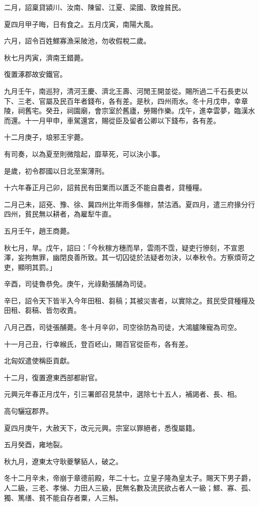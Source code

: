 \begin{pinyinscope}
二月，詔稟貸潁川、汝南、陳留、江夏、梁國、敦煌貧民。

夏四月甲子晦，日有食之。五月戊寅，南陽大風。

六月，詔令百姓鰥寡漁采陂池，勿收假稅二歲。

秋七月丙寅，濟南王錯薨。

復置涿郡故安鐵官。

九月壬午，南巡狩，清河王慶、濟北王壽、河閒王開並從。賜所過二千石長吏以下、三老、官屬及民百年者錢布，各有差。是秋，四州雨水。冬十月戊申，幸章陵，祠舊宅。癸丑，祠園廟，會宗室於舊廬，勞賜作樂。戊午，進幸雲夢，臨漢水而還。十一月甲申，車駕還宮，賜從臣及留者公卿以下錢布，各有差。

十二月庚子，琅邪王宇薨。

有司奏，以為夏至則微陰起，靡草死，可以決小事。

是歲，初令郡國以日北至案薄刑。

十六年春正月己卯，詔貧民有田業而以匱乏不能自農者，貸種糧。

二月己未，詔兗、豫、徐、冀四州比年雨多傷稼，禁沽酒。夏四月，遣三府掾分行四州，貧民無以耕者，為雇犁牛直。

五月壬午，趙王商薨。

秋七月，旱。戊午，詔曰：「今秋稼方穗而旱，雲雨不霑，疑吏行慘刻，不宣恩澤，妄拘無罪，幽閉良善所致。其一切囚徒於法疑者勿決，以奉秋令。方察煩苛之吏，顯明其罰。」

辛酉，司徒魯恭免。庚午，光祿勳張酺為司徒。

辛巳，詔令天下皆半入今年田租、芻稿；其被災害者，以實除之。貧民受貸種糧及田租、芻稿、皆勿收責。

八月己酉，司徒張酺薨。冬十月辛卯，司空徐防為司徒，大鴻臚陳寵為司空。

十一月己丑，行幸緱氏，登百岯山，賜百官從臣布，各有差。

北匈奴遣使稱臣貢獻。

十二月，復置遼東西部都尉官。

元興元年春正月戊午，引三署郎召見禁中，選除七十五人，補謁者、長、相。

高句驪寇郡界。

夏四月庚午，大赦天下，改元元興。宗室以罪絕者，悉復屬籍。

五月癸酉，雍地裂。

秋九月，遼東太守耿夔擊貊人，破之。

冬十二月辛未，帝崩于章德前殿，年二十七。立皇子隆為皇太子。賜天下男子爵，人二級，三老、孝悌、力田人三級，民無名數及流民欲占者人一級；鰥、寡、孤、獨、篤缮、貧不能自存者粟，人三斛。


\end{pinyinscope}
